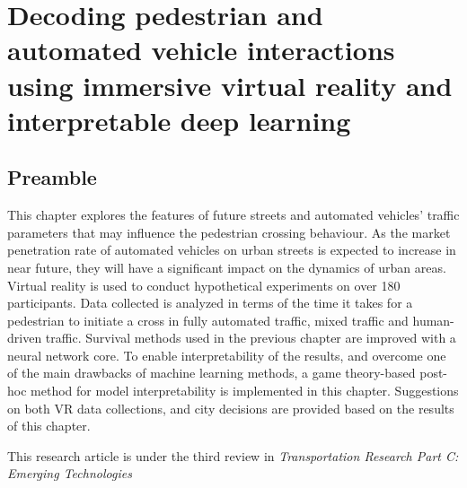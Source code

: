 \chapter{Decoding pedestrian and automated vehicle interactions using immersive virtual reality and interpretable deep learning}
\label{chap4}
\thispagestyle{empty}
\pagebreak
\section*{Preamble}
This chapter explores the features of future streets and automated vehicles' traffic parameters that may influence the  pedestrian crossing behaviour. As the market penetration rate of automated vehicles on urban streets is expected to increase in near future, they will have a significant impact on the dynamics of urban areas. Virtual reality is used to conduct hypothetical experiments on over 180 participants. Data collected is analyzed in terms of the time it takes for a pedestrian to initiate a cross in fully automated traffic, mixed traffic and human-driven traffic. Survival methods used in the previous chapter are improved with a neural network core. To enable interpretability of the results, and overcome one of the main drawbacks of machine learning methods, a game theory-based post-hoc method for model interpretability is implemented in this chapter. Suggestions on both VR data collections, and city decisions are provided based on the results of this chapter. 

\vspace{1em}
\noindent
This research article is under the third review in \textit{Transportation Research Part C: Emerging Technologies}

\clearpage

